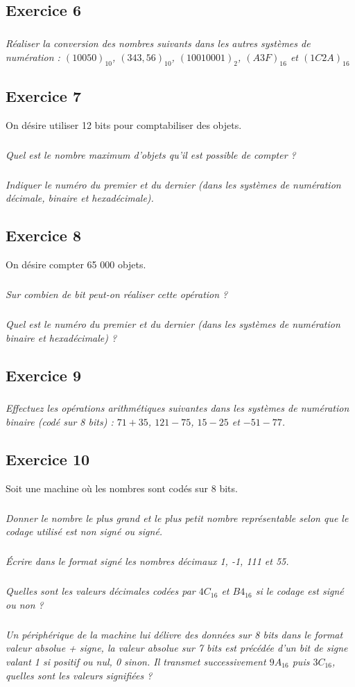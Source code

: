 \documentclass[10pt,fleqn]{article} %
\begin{document}
\begin{multicols}{2}
\subsection*{Exercice 6}
\setcounter{subparagraph}{0}
\subparagraph{}\textit{Réaliser la conversion des nombres suivants dans les autres systèmes de numération : $(10050)_{10}$, $(343,56)_{10}$, $(1001 0001)_{2}$, $(A3F)_{16}$ et $(1C2A)_{16}$}

\subsection*{Exercice 7}
\setcounter{subparagraph}{0}
On désire utiliser 12 bits pour comptabiliser des objets.
\subparagraph{}\textit{Quel est le nombre maximum d’objets qu’il est possible de compter ?}
\subparagraph{}\textit{Indiquer le numéro du premier et du dernier (dans les systèmes de numération décimale, binaire et hexadécimale).}

\subsection*{Exercice 8}
\setcounter{subparagraph}{0}
On désire compter 65 000 objets.
\subparagraph{}\textit{Sur combien de bit peut-on réaliser cette opération ? }
\subparagraph{}\textit{Quel est le numéro du premier et du dernier (dans les systèmes de numération binaire et hexadécimale) ?}

\subsection*{Exercice 9}
\setcounter{subparagraph}{0}
\subparagraph{}\textit{Effectuez les opérations arithmétiques suivantes dans les systèmes de numération binaire (codé sur 8 bits) : $71+35$, $121-75$, $15-25$ et $- 51 - 77$.}

\subsection*{Exercice 10}
\setcounter{subparagraph}{0}
Soit une machine où les nombres sont codés sur 8 bits.
\subparagraph{}\textit{Donner le nombre le plus grand et le plus petit nombre représentable selon que le codage utilisé est non signé ou signé. }
\subparagraph{}\textit{Écrire dans le format signé les nombres décimaux 1, -1, 111 et 55.}
\subparagraph{}\textit{Quelles sont  les valeurs décimales codées par $4C_{16}$ et $B4_{16}$ si le codage est signé ou non ?}
\subparagraph{}\textit{Un périphérique de la machine lui délivre des données sur 8 bits dans le format valeur absolue + signe, la valeur absolue sur 7 bits est précédée d’un bit de signe valant 1 si positif ou nul, 0 sinon. Il transmet successivement $9A_{16}$ puis $3C_{16}$, quelles sont les valeurs signifiées ? }


\end{multicols}
\end{document}
